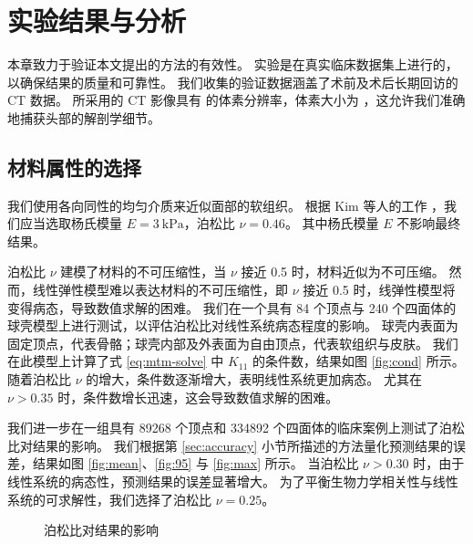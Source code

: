 
\chapter{实验结果与分析}
\label{cha:results}

本章致力于验证本文提出的方法的有效性。
实验是在真实临床数据集上进行的，以确保结果的质量和可靠性。
我们收集的验证数据涵盖了术前及术后长期回访的 CT 数据。
所采用的 CT 影像具有  的体素分辨率，体素大小为 ，这允许我们准确地捕获头部的解剖学细节。

\section{材料属性的选择}

我们使用各向同性的均匀介质来近似面部的软组织。
根据 Kim 等人的工作 \cite{mollemansPredictingSoftTissue2007}，我们应当选取杨氏模量 $E = \SI{3}{\kilo\pascal}$，泊松比 $\nu = \num{0.46}$。
其中杨氏模量 $E$ 不影响最终结果。

泊松比 $\nu$ 建模了材料的不可压缩性，当 $\nu$ 接近 \num{0.5} 时，材料近似为不可压缩。
然而，线性弹性模型难以表达材料的不可压缩性，即 $\nu$ 接近 \num{0.5} 时，线弹性模型将变得病态，导致数值求解的困难。
我们在一个具有 \num{84} 个顶点与 \num{240} 个四面体的球壳模型上进行测试，以评估泊松比对线性系统病态程度的影响。
球壳内表面为固定顶点，代表骨骼；球壳内部及外表面为自由顶点，代表软组织与皮肤。
我们在此模型上计算了式 \eqref{eq:mtm-solve} 中 $K_{11}$ 的条件数，结果如图 \ref{fig:cond} 所示。
随着泊松比 $\nu$ 的增大，条件数逐渐增大，表明线性系统更加病态。
尤其在 $\nu > 0.35$ 时，条件数增长迅速，这会导致数值求解的困难。

我们进一步在一组具有 \num{89268} 个顶点和 \num{334892} 个四面体的临床案例上测试了泊松比对结果的影响。
我们根据第 \ref{sec:accuracy} 小节所描述的方法量化预测结果的误差，结果如图 \ref{fig:mean}、\ref{fig:95} 与 \ref{fig:max} 所示。
当泊松比 $\nu > 0.30$ 时，由于线性系统的病态性，预测结果的误差显著增大。
为了平衡生物力学相关性与线性系统的可求解性，我们选择了泊松比 $\nu = 0.25$。

\begin{figure}[H]
  \centering
  \caption{泊松比对结果的影响}
\end{figure}

